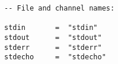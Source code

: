 \begin{verbatim}
-- File and channel names:

stdin       =  "stdin"
stdout      =  "stdout"
stderr      =  "stderr"
stdecho     =  "stdecho"
\end{verbatim}